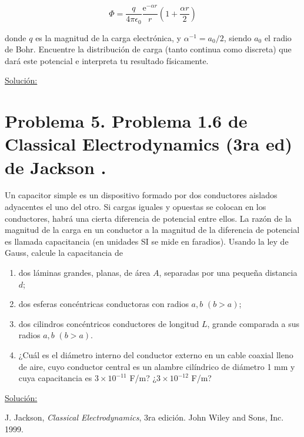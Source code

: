 \documentclass[a4paper,10pt]{article}
\numberwithin{equation}{section}
\newcommand{\euler}{\mathrm{e}}
\begin{document}
$$
\Phi = \frac{q}{4\pi\epsilon_0}\frac{\euler^{-\alpha r}}{r}\left(1 + 
\frac{\alpha r}{2}\right)
$$

donde $q$ es la magnitud de la carga electrónica, y $\alpha^{-1} = a_0/2$, siendo 
$a_0$ el radio de Bohr. Encuentre la distribución de carga (tanto continua como 
discreta) que dará este potencial e interpreta tu resultado físicamente.

\vspace{.3cm}

\underline{Solución:} \vspace{.3cm}

\section{Problema 5. Problema 1.6 de Classical Electrodynamics (3ra ed) de 
Jackson \cite{jackson}.}

Un capacitor simple es un dispositivo formado por dos conductores aislados 
adyacentes el uno del otro. Si cargas iguales y opuestas se colocan en los 
conductores, habrá una cierta diferencia de potencial entre ellos. La razón de 
la magnitud de la carga en un conductor a la magnitud de la diferencia de 
potencial es llamada capacitancia (en unidades SI se mide en faradios). Usando la 
ley de Gauss, calcule la capacitancia de 

\begin{enumerate}[label=\textbf{(\alph*)}]
 \item dos láminas grandes, planas, de área $A$, separadas por una pequeña 
 distancia $d$;
 \item dos esferas concéntricas conductoras con radios $a,b$ $(b > a)$;
 \item dos cilindros concéntricos conductores de longitud $L$, grande comparada 
 a sus radios $a,b$ $(b > a)$.
 \item ¿Cuál es el diámetro interno del conductor externo en un cable coaxial 
 lleno de aire, cuyo conductor central es un alambre cilíndrico de diámetro 
 1 mm y cuya capacitancia es $3\times 10^{-11}$ F/m? ¿$3\times 10^{-12}$ F/m?
\end{enumerate}

\vspace{.3cm}

\underline{Solución:} \vspace{.3cm}

\begin{thebibliography}{10}
J. Jackson, \emph{Classical Electrodynamics}, 3ra edición. John Wiley and Sons, Inc. 
1999.
\end{thebibliography}
\end{document}
